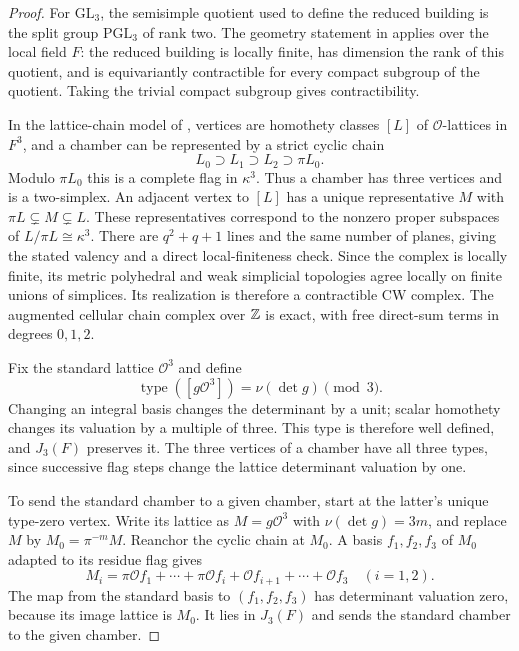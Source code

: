 \begin{proof}
For $\mathrm{GL}_3$, the semisimple quotient used to define the reduced
building is the split group $\mathrm{PGL}_3$ of rank two.
The geometry statement in
\cite[Section~1.1.2, p.~6]{MeyerSolleveldBuildings}
applies over the local field $F$: the reduced building is locally finite,
has dimension the rank of this quotient, and is equivariantly contractible
for every compact subgroup of the quotient.  Taking the trivial compact
subgroup gives contractibility.

In the lattice-chain model of
\cite[Section~5.6, pp.~952--953]{DeligneFlicker2013}, vertices are homothety
classes $[L]$ of $\mathcal O$-lattices in $F^3$, and a chamber can be
represented by a strict cyclic chain
\[
 L_0\supset L_1\supset L_2\supset\pi L_0.
\]
Modulo $\pi L_0$ this is a complete flag in $\kappa^3$.  Thus a chamber
has three vertices and is a two-simplex.  An adjacent vertex to $[L]$ has
a unique representative $M$ with $\pi L\subsetneq M\subsetneq L$.
These representatives correspond to the nonzero proper subspaces of
$L/\pi L\cong\kappa^3$.  There are $q^2+q+1$ lines and the same number
of planes, giving the stated valency and a direct local-finiteness check.
Since the complex is locally finite, its metric polyhedral and weak
simplicial topologies agree locally on finite unions of simplices.  Its
realization is therefore a contractible CW complex.  The augmented
cellular chain complex over $\mathbb Z$ is exact, with free direct-sum terms
in degrees $0,1,2$.

Fix the standard lattice $\mathcal O^3$ and define
\[
 \operatorname{type}([g\mathcal O^3])=\nu(\det g)\pmod 3.
\]
Changing an integral basis changes the determinant by a unit; scalar
homothety changes its valuation by a multiple of three.  This type is
therefore well defined, and $J_3(F)$ preserves it.  The three vertices of
a chamber have all three types, since successive flag steps change the
lattice determinant valuation by one.

To send the standard chamber to a given chamber, start at the latter's
unique type-zero vertex.  Write its lattice as $M=g\mathcal O^3$ with
$\nu(\det g)=3m$, and replace $M$ by $M_0=\pi^{-m}M$.  Reanchor the
cyclic chain at $M_0$.  A basis $f_1,f_2,f_3$ of $M_0$ adapted to its
residue flag gives
\[
 M_i=\pi\mathcal O f_1+\cdots+\pi\mathcal O f_i
       +\mathcal O f_{i+1}+\cdots+\mathcal O f_3
 \quad(i=1,2).
\]
The map from the standard basis to $(f_1,f_2,f_3)$ has determinant
valuation zero, because its image lattice is $M_0$.  It lies in $J_3(F)$
and sends the standard chamber to the given chamber.


\end{proof}
